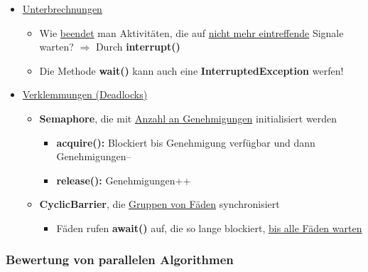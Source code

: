 \begin{itemize}
\begin{itemize}
\begin{itemize}
\color{red}{$\Rightarrow$ Sicher ist nur: notifyAll()}
\end{itemize}
\end{itemize}
\item \underline{Unterbrechnungen}
\begin{itemize}
\item Wie \underline{beendet} man Aktivitäten, die auf \underline{nicht mehr eintreffende} Signale warten?
$\Rightarrow$ Durch \textbf{interrupt()}
\item Die Methode \textbf{wait()} kann auch eine \textbf{InterruptedException} werfen!
\end{itemize}
\item \underline{Verklemmungen (Deadlocks)}
\begin{itemize}
\item \textbf{Semaphore}, die mit \underline{Anzahl an Genehmigungen} initialisiert werden
\begin{itemize}
\item \textbf{acquire():} Blockiert bis Genehmigung verfügbar und dann Genehmigungen--
\item \textbf{release():} Genehmigungen++
\end{itemize}
\item \textbf{CyclicBarrier}, die \underline{Gruppen von Fäden} synchronisiert
\begin{itemize}
\item Fäden rufen \textbf{await()} auf, die so lange blockiert, \underline{bis alle Fäden warten}
\end{itemize}
\end{itemize}
\end{itemize}
		
\newpage
\subsubsection{Bewertung von parallelen Algorithmen}
			
